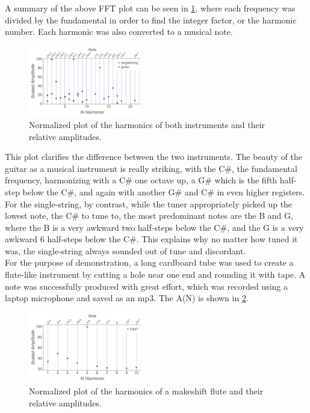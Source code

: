 \documentclass[aps,prl,reprint]{revtex4-2}
\begin{document}
A summary of the above FFT plot can be seen in \ref{harmonics}, where
each frequency was divided by the fundamental in order to find the
integer factor, or the harmonic number. Each harmonic was also
converted to a musical note. 

\begin{figure}[h]
\includegraphics[width=0.44\textwidth]{../Images/l5_f.png}
\caption{\label{harmonics} Normalized plot of the harmonics
of both instruments and their relative amplitudes. }
\end{figure}

This plot clarifies the difference between the two instruments. The
beauty of the guitar as a musical instrument is really striking,
with the C#, the fundamental frequency, harmonizing with a C#
one octave up, a G# which is the fifth half-step below the C#,
and again with another G# and C# in even higher registers. 
For the single-string, by contrast,
while the tuner appropriately picked up the lowest
note, the C# to tune to, the most predominant notes are the 
B and G, where the B is a very awkward two half-steps below
the C#, and the G is a very awkward 6 half-steps below the C#. 
This explains why no matter how tuned it was, the single-string
always sounded out of tune and discordant. \\

For the purpose of demonstration, a long cardboard tube was
used to create a flute-like instrument by cutting a hole near
one end and rounding it with tape. A note was successfully
produced with great effort, which was recorded using a laptop
microphone and saved as an mp3. The A(N) is shown in \ref{flute?}.

\begin{figure}[h]
\includegraphics[width=0.44\textwidth]{../Images/l5_optional_flute_harmonics.png}
\caption{\label{flute?} Normalized plot of the harmonics
of a makeshift flute and their relative amplitudes. }
\end{figure}
\end{document}
